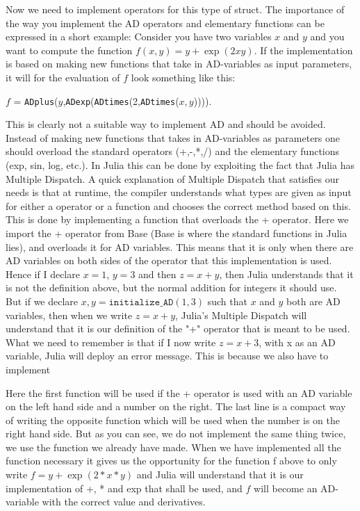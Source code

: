 Now we need to implement operators for this type of struct. The importance of the way you implement the AD operators and elementary functions can be expressed in a short example: Consider you have two variables $x$ and $y$ and you want to compute the function $f(x,y) = y+\exp(2xy)$. If the implementation is based on making new functions that take in AD-variables as input parameters, it will for the evaluation of $f$ look something like this: 
\begin{center}
    $f$ = \texttt{ADplus}($y$,\texttt{ADexp}(\texttt{ADtimes}(2,\texttt{ADtimes}($x,y$)))).
\end{center}
This is clearly not a suitable way to implement AD and should be avoided. Instead of making new functions that takes in AD-variables as parameters one should overload the standard operators (+,-,*,/) and the elementary functions (exp, sin, log, etc.). In Julia this can be done by exploiting the fact that Julia has Multiple Dispatch. A quick explanation of Multiple Dispatch that satisfies our needs is that at runtime, the compiler understands what types are given as input for either a operator or a function and chooses the correct method based on this. This is done by implementing a function  
that overloads the + operator. Here we import the + operator from Base (Base is where the standard functions in Julia lies), and overloads it for AD variables. This means that it is only when there are AD variables on both sides of the operator that this implementation is used. Hence if I declare $x = 1$, $y = 3$ and then $z = x+y$, then Julia understands that it is not the definition above, but the normal addition for integers it should use. But if we declare $x,y = \texttt{initialize\_AD}(1,3)$ such that $x$ and $y$ both are AD variables, then when we write $z = x+y$, Julia's Multiple Dispatch will understand that it is our definition of the "+" operator that is meant to be used. What we need to remember is that if I now write $z = x + 3$, with x as an AD variable, Julia will deploy an error message. This is because we also have to implement

Here the first function will be used if the + operator is used with an AD variable on the left hand side and a number on the right. The last line is a compact way of writing the opposite function which will be used when the number is on the right hand side. But as you can see, we do not implement the same thing twice, we use the function we already have made. When we have implemented all the function necessary it gives us the opportunity for the function f above to only write $f = y+\exp(2*x*y)$ and Julia will understand that it is our implementation of +, * and exp that shall be used, and $f$ will become an AD-variable with the correct value and derivatives. 

